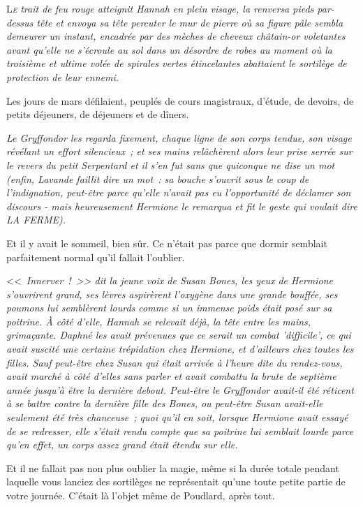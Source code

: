 
\lettrine{L}{\emph{e}} \emph{trait de feu rouge atteignit Hannah en plein visage, la renversa pieds par-dessus tête et envoya sa tête percuter le mur de pierre où sa figure pâle sembla demeurer un instant, encadrée par des mèches de cheveux châtain-or voletantes avant qu'elle ne s'écroule au sol dans un désordre de robes au moment où la troisième et ultime volée de spirales vertes étincelantes abattaient le sortilège de protection de leur ennemi.}

Les jours de mars défilaient, peuplés de cours magistraux, d'étude, de devoirs, de petits déjeuners, de déjeuners et de dîners.

\emph{Le Gryffondor les regarda fixement, chaque ligne de son corps tendue, son visage révélant un effort silencieux~; et ses mains relâchèrent alors leur prise serrée sur le revers du petit Serpentard et il s'en fut sans que quiconque ne dise un mot (enfin, Lavande faillit dire un mot~: sa bouche s'ouvrit sous le coup de l'indignation, peut-être parce qu'elle n'avait pas eu l'opportunité de déclamer son discours - mais heureusement Hermione le remarqua et fit le geste qui voulait dire LA FERME).}

Et il y avait le sommeil, bien sûr. Ce n'était pas parce que dormir semblait parfaitement normal qu'il fallait l'oublier.

<<~\emph{Innerver~!~>> dit la jeune voix de Susan Bones, les yeux de Hermione s'ouvrirent grand, ses lèvres aspirèrent l'oxygène dans une grande bouffée, ses poumons lui semblèrent lourds comme si un immense poids était posé sur sa poitrine. À côté d'elle, Hannah se relevait déjà, la tête entre les mains, grimaçante. Daphné les avait prévenues que ce serait un combat 'difficile', ce qui avait suscité une certaine trépidation chez Hermione, et d'ailleurs chez toutes les filles. Sauf peut-être chez Susan qui était arrivée à l'heure dite du rendez-vous, avait marché à côté d'elles sans parler et avait combattu la brute de septième année jusqu'à être la dernière debout. Peut-être le Gryffondor avait-il été réticent à se battre contre la dernière fille des Bones, ou peut-être Susan avait-elle seulement été très chanceuse~; quoi qu'il en soit, lorsque Hermione avait essayé de se redresser, elle s'était rendu compte que sa poitrine lui semblait lourde parce qu'en effet, un corps assez grand était étendu sur elle.}

Et il ne fallait pas non plus oublier la magie, même si la durée totale pendant laquelle vous lanciez des sortilèges ne représentait qu'une toute petite partie de votre journée. C'était là l'objet même de Poudlard, après tout.

